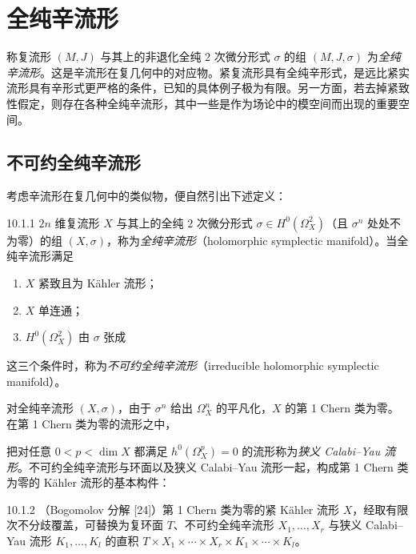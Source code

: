 \chapter{全纯辛流形}

称复流形 $(M,J)$ 与其上的非退化全纯 $2$ 次微分形式 $\sigma$ 的组 $(M,J,\sigma)$ 为\emph{全纯辛流形}。这是辛流形在复几何中的对应物。紧复流形具有全纯辛形式，是远比紧实流形具有辛形式更严格的条件，已知的具体例子极为有限。另一方面，若去掉紧致性假定，则存在各种全纯辛流形，其中一些是作为场论中的模空间而出现的重要空间。

\section{不可约全纯辛流形}

考虑辛流形在复几何中的类似物，便自然引出下述定义：

\begin{definition}{10.1.1}
  $2n$ 维复流形 $X$ 与其上的全纯 $2$ 次微分形式 $\sigma\in H^0(\Omega_X^2)$（且 $\sigma^n$ 处处不为零）的组 $(X,\sigma)$，称为\emph{全纯辛流形}（holomorphic symplectic manifold）。当全纯辛流形满足
  \begin{enumerate}
    \item[(i)] $X$ 紧致且为 Kähler 流形；
    \item[(ii)] $X$ 单连通；
    \item[(iii)] $H^0(\Omega_X^2)$ 由 $\sigma$ 张成
  \end{enumerate}
  这三个条件时，称为\emph{不可约全纯辛流形}（irreducible holomorphic symplectic manifold）。
\end{definition}


对全纯辛流形 $(X,\sigma)$，由于 $\sigma^n$ 给出 $\Omega_X^n$ 的平凡化，$X$ 的第 1 Chern 类为零。在第 1 Chern 类为零的流形之中，

把对任意 $0<p<\dim X$ 都满足 $h^0(\Omega_X^p)=0$ 的流形称为\emph{狭义 Calabi--Yau 流形}。不可约全纯辛流形与环面以及狭义 Calabi--Yau 流形一起，构成第 1 Chern 类为零的 Kähler 流形的基本构件：


\begin{theorem}{10.1.2}
  （Bogomolov 分解 [24]）第 1 Chern 类为零的紧 Kähler 流形 $X$，经取有限次不分歧覆盖，可替换为复环面 $T$、不可约全纯辛流形 $X_1,\dots,X_r$ 与狭义 Calabi--Yau 流形 $K_1,\dots,K_l$ 的直积 $T\times X_1\times\cdots\times X_r\times K_1\times\cdots\times K_l$。
\end{theorem}


